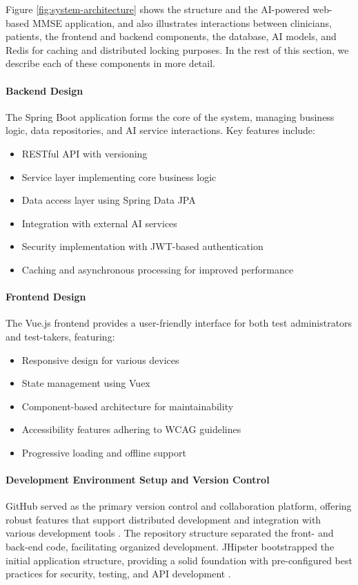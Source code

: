 Figure \ref{fig:system-architecture} shows the structure and the AI-powered web-based MMSE application, and also illustrates interactions between clinicians, patients, the frontend and backend components, the database, AI models, and Redis for caching and distributed locking purposes. In the rest of this section, we describe each of these components in more detail.

\paragraph{Backend Design}
The Spring Boot application forms the core of the system, managing business logic, data repositories, and AI service interactions. Key features include:
\begin{itemize}
    \item RESTful API with versioning
    \item Service layer implementing core business logic
    \item Data access layer using Spring Data JPA
    \item Integration with external AI services
    \item Security implementation with JWT-based authentication
    \item Caching and asynchronous processing for improved performance
\end{itemize}

\paragraph{Frontend Design}
The Vue.js frontend provides a user-friendly interface for both test administrators and test-takers, featuring:
\begin{itemize}
    \item Responsive design for various devices
    \item State management using Vuex
    \item Component-based architecture for maintainability
    \item Accessibility features adhering to WCAG guidelines
    \item Progressive loading and offline support
\end{itemize}

\paragraph{Development Environment Setup and Version Control}
GitHub served as the primary version control and collaboration platform, offering robust features that support distributed development and integration with various development tools \cite{github}. The repository structure separated the front- and back-end code, facilitating organized development. JHipster bootstrapped the initial application structure, providing a solid foundation with pre-configured best practices for security, testing, and API development \cite{jhipster}.

